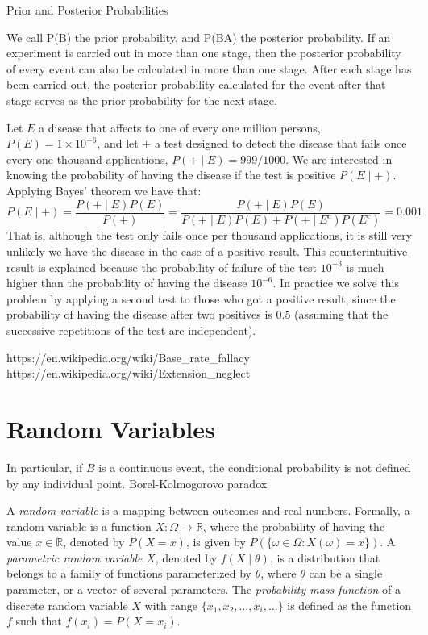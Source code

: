 Prior and Posterior Probabilities

We call P\left(B\right) the prior probability, and P\left(B\mid A\right) the posterior probability. If an experiment is carried out in more than one stage, then the posterior probability of every event can also be calculated in more than one stage. After each stage has been carried out, the posterior probability calculated for the event after that stage serves as the prior probability for the next stage.

\begin{example}
Let $E$ a disease that affects to one of every one million persons, $P(E) = 1 \times 10^{-6}$, and let $+$ a test designed to detect the disease that fails once every one thousand applications, $P(+ \mid E) = 999/1000$. We are interested in knowing the probability of having the disease if the test is positive $P(E \mid +)$. Applying Bayes' theorem we have that:
\[
P(E \mid +) = \frac{P(+ \mid E) P(E)}{P(+)} = \frac{P(+ \mid E) P(E)}{P(+ \mid E) P(E) + P(+ \mid E^c) P(E^c)} = 0.001
\]
That is, although the test only fails once per thousand applications, it is still very unlikely we have the disease in the case of a positive result. This counterintuitive result is explained because the probability of failure of the test $10^{-3}$ is much higher than the probability of having the disease $10^{-6}$. In practice we solve this problem by applying a second test to those who got a positive result, since the probability of having the disease after two positives is $0.5$ (assuming that the successive repetitions of the test are independent).

https://en.wikipedia.org/wiki/Base_rate_fallacy
https://en.wikipedia.org/wiki/Extension_neglect

\end{example}




%
%

\section{Random Variables}
\label{sec:probability_random_variables}

{\color{red} In particular, if $B$ is a continuous event, the conditional probability is not defined by any individual point. Borel-Kolmogorovo paradox}


A \emph{random variable} is a mapping between outcomes and real numbers. Formally, a random variable is a function $X : \Omega \rightarrow \mathbb{R}$, where the probability of having the value $x \in \mathbb{R}$, denoted by $P(X=x)$, is given by $P(\{ \omega \in \Omega : X(\omega) = x\})$. A \emph{parametric random variable} $X$, denoted by $f\left(X \mid \theta \right)$, is a distribution that belongs to a family of functions parameterized by $\theta$, where $\theta$ can be a single parameter, or a vector of several parameters. The \emph{probability mass function} of a discrete random variable $X$ with range $\{ x_1, x_2, \ldots, x_i, \ldots \}$ is defined as the function $f$ such that $f(x_i) = P(X=x_i)$.

